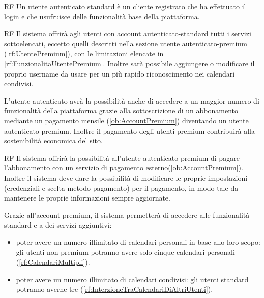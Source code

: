 \begin{listaPersonale}{RF}
	 Un utente autenticato standard è un cliente registrato che ha effettuato il login e che usufruisce delle funzionalità base della piattaforma.
	\begin{listaPersonale2}{RF}
		 Il sistema offrirà agli utenti con account autenticato-standard tutti i servizi sottoelencati, eccetto quelli descritti nella sezione utente autenticato-premium (\ref{rf:UtentePremium}), con le limitazioni elencate in \ref{rf:FunzionalitaUtentePremium}. Inoltre sarà possibile aggiungere o modificare il proprio username da usare per un più rapido riconoscimento nei calendari condivisi.
	\end{listaPersonale2}

	 L'utente autenticato avrà la possibilità anche di accedere a un maggior numero di funzionalità della piattaforma grazie alla sottoscrizione di un abbonamento mediante un pagamento mensile (\ref{ob:AccountPremium}) diventando un utente autenticato premium. Inoltre il pagamento degli utenti premium contribuirà alla sostenibilità economica del sito.
	\begin{listaPersonale2}{RF}
		 Il sistema offrirà la possibilità all'utente autenticato premium di pagare l'abbonamento con un servizio di pagamento esterno(\ref{ob:AccountPremium}). Inoltre il sistema deve dare la possibilità di modificare le proprie impostazioni (credenziali e scelta metodo pagamento) per il pagamento, in modo tale da mantenere le proprie informazioni sempre aggiornate.

		 Grazie all'account premium, il sistema permetterà di accedere alle funzionalità standard e a dei servizi aggiuntivi:
		\begin{itemize}
			\item poter avere un numero illimitato di calendari personali in base allo loro scopo: gli utenti non premium potranno avere solo cinque calendari personali (\ref{rf:CalendariMultipli}).
			\item poter avere un numero illimitato di calendari condivisi: gli utenti standard potranno averne tre (\ref{rf:InterzioneTraCalendariDiAltriUtenti}).
		\end{itemize}
	\end{listaPersonale2}


\end{listaPersonale}
